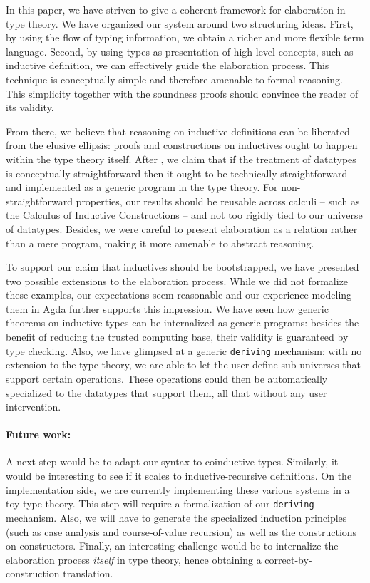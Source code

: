 \documentclass{scrartcl}
\theoremstyle{plain}
\theoremstyle{definition}
\begin{document}
In this paper, we have striven to give a coherent framework for
elaboration in type theory. We have organized our system around two
structuring ideas. First, by using the flow of typing information, we
obtain a richer and more flexible term language. Second, by using
types as presentation of high-level concepts, such as inductive
definition, we can effectively guide the elaboration process. This
technique is conceptually simple and therefore amenable to formal
reasoning. This simplicity together with the soundness proofs should
convince the reader of its validity.



From there, we believe that reasoning on inductive definitions can be
liberated from the elusive ellipsis: proofs and constructions on
inductives ought to happen within the type theory itself. After
\citet{harper:elaboration}, we claim that if the treatment of
datatypes is conceptually straightforward then it ought to be
technically straightforward and implemented as a generic program in
the type theory. For non-straightforward properties, our results
should be reusable across calculi -- such as the Calculus of Inductive
Constructions -- and not too rigidly tied to our universe of
datatypes. Besides, we were careful to present elaboration as a
relation rather than a mere program, making it more amenable to
abstract reasoning.



To support our claim that inductives should be bootstrapped, we have
presented two possible extensions to the elaboration process. While we
did not formalize these examples, our expectations seem reasonable and
our experience modeling them in Agda further supports this
impression. We have seen how generic theorems on inductive types can
be internalized as generic programs: besides the benefit of reducing
the trusted computing base, their validity is guaranteed by type
checking. Also, we have glimpsed at a generic \texttt{deriving}
mechanism: with no extension to the type theory, we are able to
let the user define sub-universes that support certain
operations. These operations could then be automatically specialized
to the datatypes that support them, all that without any user
intervention.



\paragraph{Future work:} A next step would be to adapt our syntax to coinductive
types. Similarly, it would be interesting to see if it scales to
inductive-recursive definitions. On the implementation side, we are
currently implementing these various systems in a toy type
theory. This step will require a formalization of our
\texttt{deriving} mechanism. Also, we will have to generate the
specialized induction principles (such as case analysis and
course-of-value recursion) as well as the constructions on
constructors. Finally, an interesting challenge would be to
internalize the elaboration process \emph{itself} in type theory,
hence obtaining a correct-by-construction translation.
\end{document}
